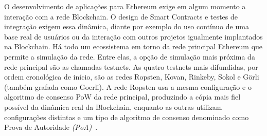 \documentclass[a4paper,11pt]{article}
\begin{document}
O desenvolvimento de aplicações para Ethereum exige em algum momento a interação com a rede Blockchain.
O design de Smart Contracts e testes de integração exigem essa dinâmica, %
diante por exemplo do uso contínuo de uma base real de usuários ou da interação com outros projetos igualmente implantados na Blockchain.
Há todo um ecossistema em torno da rede principal Ethereum que permite a simulação da rede. %
Entre elas, a opção de simulação mais próxima da rede principal são as chamadas testnets.
As quatro testnets mais difundidas, por ordem cronológica de início, são as redes Ropsten, Kovan, Rinkeby, Sokol e Görli (também grafada como Goerli).
A rede Ropsten usa a mesma configuração e o algoritmo de consenso PoW da rede principal, produzindo a cópia mais fiel possível da dinâmica real da Blockchain, enquanto as outras utilizam configurações distintas e um tipo de algoritmo de consenso denominado como Prova de Autoridade \emph{(PoA)}~\cite{DeAngelis2018}.

\end{document}

